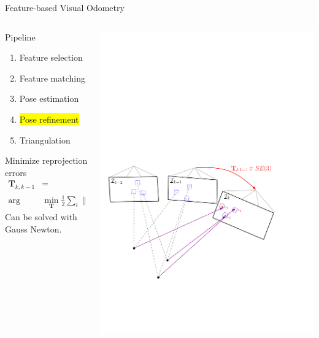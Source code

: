 \documentclass[10pt]{beamer}
\newcommand{\T}{\mathbf{T}}
\newcommand{\bu}{\mathbf{u}}
\newcommand{\bp}{\mathbf{p}}
\begin{document}
\begin{frame}{Feature-based Visual Odometry}
	\begin{columns}
	  \begin{column}{0.4\textwidth}
	  	\begin{block}{Pipeline}
		  	\begin{enumerate}
				\item Feature selection
				\item Feature matching
				\item Pose estimation
				\item \colorbox{yellow}{Pose refinement}
				\item Triangulation
			\end{enumerate}
		\end{block}
		\begin{block}{Minimize reprojection errors}
			\[
				\begin{aligned}
  				\T_{k,k-1} &= \\
  				       \arg&\min_{\T} \frac{1}{2} \sum_{i} \parallel \bu_i - \pi(\T \ _{k-1}\bp_i) \parallel^2.
  				\end{aligned}
			\]
			Can be solved with Gauss Newton.
		\end{block}
	  \end{column}
	  \begin{column}{0.6\textwidth}
	    \includegraphics[width=\textwidth]{img/vo_pipeline_6}
	  \end{column}
	\end{columns}
\end{frame}
\end{document}
